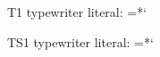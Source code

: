 \documentclass{article}
\begin{document}
T1 typewriter literal:
{\fontsize{8}{10}\selectfont =*`}

TS1 typewriter literal:
{\fontsize{8}{10}\selectfont =*`}
\end{document}
